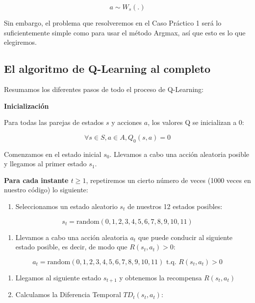\documentclass[
]{book}
\providecommand{\tightlist}{%
  \setlength{\itemsep}{0pt}\setlength{\parskip}{0pt}}
\begin{document}
\[a \sim W_s(.)\]

Sin embargo, el problema que resolveremos en el Caso Práctico 1 será lo suficientemente simple como para usar el método Argmax, así que esto es lo que elegiremos.

\hypertarget{el-algoritmo-de-q-learning-al-completo}{%
\subsection{El algoritmo de Q-Learning al completo}\label{el-algoritmo-de-q-learning-al-completo}}

Resumamos los diferentes pasos de todo el proceso de Q-Learning:

\textbf{Inicialización}

Para todas las parejas de estados \(s\) y acciones \(a\), los valores Q se inicializan a 0:

\[\forall s \in S, a \in A, Q_0(s,a) = 0\]

Comenzamos en el estado inicial \(s_0\). Llevamos a cabo una acción aleatoria posible y llegamos al primer estado \(s_1\).

\textbf{Para cada instante \(t \ge 1\)}, repetiremos un cierto número de veces (1000 veces en nuestro código) lo siguiente:

\begin{enumerate}
\def\labelenumi{\arabic{enumi}.}
\tightlist
\item
  Seleccionamos un estado aleatorio \(s_t\) de nuestros 12 estados posibles:
\end{enumerate}

\[s_t = \textrm{random}(0,1,2,3,4,5,6,7,8,9,10,11)\]

\begin{enumerate}
\def\labelenumi{\arabic{enumi}.}
\setcounter{enumi}{1}
\tightlist
\item
  Llevamos a cabo una acción aleatoria \(a_t\) que puede conducir al siguiente estado posible, es decir, de modo que \(R(s_t,a_t) > 0\):
\end{enumerate}

\[a_t = \textrm{random}(0,1,2,3,4,5,6,7,8,9,10,11) \textrm{ t.q. } R(s_t,a_t) > 0\]

\begin{enumerate}
\def\labelenumi{\arabic{enumi}.}
\setcounter{enumi}{2}
\item
  Llegamos al siguiente estado \(s_{t + 1}\) y obtenemos la recompensa \(R(s_t,a_t)\)
\item
  Calculamos la Diferencia Temporal \(TD_t(s_t,a_t)\):
\end{enumerate}
\end{document}
